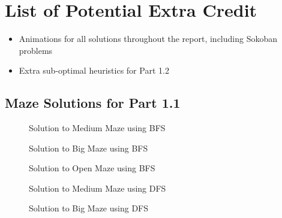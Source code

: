 \documentclass{article}[12pt]
\begin{document}
   
\newpage
   \section{List of Potential Extra Credit}
   \begin{itemize}
   \item Animations for all solutions throughout the report, including Sokoban problems
   \item Extra sub-optimal heuristics for Part 1.2
\end{itemize}      
   
   \newpage
\begin{appendices}

\section{Maze Solutions for Part 1.1}
   \label{appendix:p11}
   
   \begin{figure}[!htb]
   \centering
   \caption{Solution to Medium Maze using BFS}
   \label{fig:bfs_medmaze}
   \end{figure}
   
   \begin{figure}[!htb]
   \centering
   \caption{Solution to Big Maze using BFS}
   \label{fig:bfs_bigmaze}
   \end{figure}
   
   \begin{figure}[!htb]
   \centering
   \caption{Solution to Open Maze using BFS}
   \label{fig:bfs_openmaze}
   \end{figure}
   
   \begin{figure}[!htb]
   \centering
   \caption{Solution to Medium Maze using DFS}
   \label{fig:dfs_medmaze}
   \end{figure}
   
   \begin{figure}[!htb]
   \centering
   \caption{Solution to Big Maze using DFS}
   \label{fig:dfs_bigmaze}
   \end{figure}
   

\end{appendices}
\end{document}
